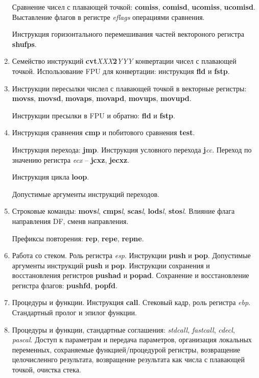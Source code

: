 \documentclass[a4paper,10pt]{article}
\begin{document}
\begin{enumerate}
        Сравнение чисел с плавающей точкой: \textbf{comiss}, \textbf{comisd}, \textbf{ucomiss}, \textbf{ucomisd}. 
        Выставление флагов в регистре \textit{eflags} операциями сравнения.
    
        Инструкция горизонтального перемешивания частей вектороного регистра \textbf{shufps}.
    \item
        Семейство инструкций \textbf{cvt}\textit{XXX}\textbf{2}\textit{YYY} конвертации чисел с плавающей точкой. Использование FPU для
        конвертации: инструкция \textbf{fld} и \textbf{fstp}.
    \item
        Инструкции пересылки  числел с плавающей точкой в векторные регистры: \textbf{movss}, \textbf{movsd}, \textbf{movaps}, \textbf{movapd},
        \textbf{movups}, \textbf{movupd}.
        
        Инструкции пресылки в FPU и обратно: \textbf{fld} и \textbf{fstp}. 
    \item
        Инструкция сравнения \textbf{cmp} и побитового сравнения \textbf{test}.
    
        Инструкция перехода: \textbf{jmp}. Инструкция условного перехода \textbf{j}\textit{cc}. Переход по значению регистра \textit{ecx} --
        \textbf{jcxz}, \textbf{jecxz}.
    
        Инструкция цикла \textbf{loop}.
    
        Допустимые аргументы инструкций переходов.
    \item
        Строковые команды: \textbf{movs}\textit{l}, \textbf{cmps}\textit{l}, \textbf{scas}\textit{l}, \textbf{lods}\textit{l}, \textbf{stos}\textit{l}.
        Влияние флага направления DF, сменв направления.
    
        Префиксы повторения: \textbf{rep}, \textbf{repe}, \textbf{repne}.
    \item
        Работа со стеком. Роль регистра \textit{esp}. Инструкции \textbf{push} и \textbf{pop}. Допустимые аргументы инструкций \textbf{push} и \textbf{pop}.
        Инструкции сохранения и восстановления регистров \textbf{pushad} и \textbf{popad}. 
        Сохранение и восстановление регистра флагов: \textbf{pushfd}, \textbf{popfd}.
    \item
        Процедуры и функции. Инструкция \textbf{call}. Стековый кадр, роль регистра \textit{ebp}. Стандартный пролог и эпилог функции.
    \item
        Процедуры и функции, стандартные соглашения: \textit{stdcall}, \textit{fastcall}, \textit{cdecl}, \textit{pascal}. 
        Доступ к параметрам и передача параметров, организация локальных переменных, сохраняемые функцией/процедурой регистры,
        возвращение целочисленнго результата, возвращение результата как числа с плавающей точкой, очистка стека.
    

\end{enumerate}
\end{document}
